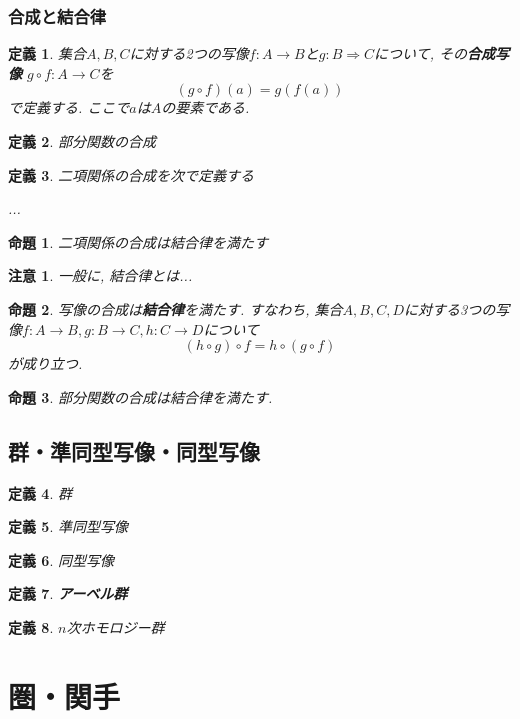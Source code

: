\documentclass{jsbook}
\theoremstyle{plain}
\newtheorem{Def}{定義}[chapter]
\newtheorem{Prop}{命題}[chapter]
\newtheorem{caution}{注意}[chapter]
\begin{document}
\subsection{合成と結合律}
\begin{Def}
集合$A,B,C$に対する2つの写像$f:A\rightarrow B$と$g:B\Rightarrow C$について, その{\bf 合成写像} $g\circ f:A\rightarrow C$を
\[
(g\circ f)(a)=g(f(a))
\]
で定義する. ここで$a$は$A$の要素である.
\end{Def}
\begin{Def}
部分関数の合成
\end{Def}
\begin{Def}
二項関係の合成を次で定義する

...
\end{Def}
\begin{Prop}
二項関係の合成は結合律を満たす
\end{Prop}
\begin{caution}
一般に, 結合律とは...
\end{caution}
\begin{Prop}
写像の合成は{\bf 結合律}を満たす.
すなわち, 集合$A,B,C,D$に対する3つの写像$f:A\rightarrow B, g:B\rightarrow C,
h:C\rightarrow D$について
\[
(h\circ g)\circ f=h\circ(g\circ f)
\]
が成り立つ.
\end{Prop}
\begin{Prop}
部分関数の合成は結合律を満たす.
\end{Prop}
\section{群・準同型写像・同型写像}
\begin{Def}
群
\end{Def}
\begin{Def}
準同型写像
\end{Def}
\begin{Def}
同型写像
\end{Def}
\begin{Def}
{\bf アーベル群}
\end{Def}
\begin{Def}
$n$次ホモロジー群
\end{Def}

\chapter{圏・関手}
\end{document}
